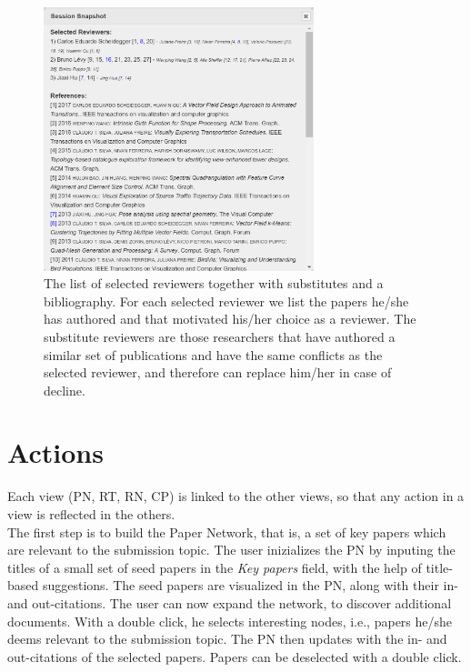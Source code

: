 \begin{figure}
\centering
\includegraphics[width=0.7\textwidth]{images/list.png}
\caption{The list of selected reviewers together with substitutes and a bibliography. For each selected reviewer we list the papers he/she has authored and that motivated his/her choice as a reviewer.  The substitute reviewers are those researchers that have authored a similar set of publications and have the same conflicts as the selected reviewer, and therefore can replace him/her in case of decline.}
\label{fig:list}
\end{figure}


\section{Actions}
\label{subsec:actions}

Each view (PN, RT, RN, CP) is linked to the other views, so that any action in a view is reflected in the others. \\

The first step is to build the Paper Network, that is, a set of key papers which are relevant to the submission topic. The user inizializes the PN by inputing the titles of a small set of seed papers in the \emph{Key papers} field, with the help of title-based suggestions. The seed papers are visualized in the PN, along with their in- and out-citations. The user can now expand the network, to discover additional documents. With a double click, he selects interesting nodes, i.e., papers he/she deems relevant to the submission topic. The PN then updates with the in- and out-citations of the selected papers. Papers can be deselected with a double click. 

